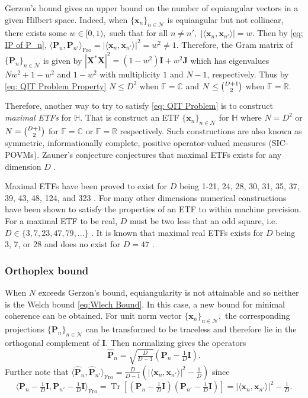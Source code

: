 \documentclass[3p,11pt]{elsarticle}
\newcommand{\bbC}{\mathbb{C}}
\newcommand{\bbF}{\mathbb{F}}
\newcommand{\bbH}{\mathbb{H}}
\newcommand{\bbR}{\mathbb{R}}
\newcommand{\bfI}{\mathbf{I}}
\newcommand{\bfJ}{\mathbf{J}}
\newcommand{\bfP}{\mathbf{P}}
\newcommand{\bfx}{\mathbf{x}}
\newcommand{\bfX}{\mathbf{X}}
\newcommand{\calN}{\mathcal{N}}
\newcommand{\Tr}{\operatorname{Tr}}
\newcommand{\Fro}{\mathrm{Fro}}
\newcommand{\abs}[1]{|{#1}|}
\newcommand{\ip}[2]{\langle{#1},{#2}\rangle}
\theoremstyle{definition}
\begin{document}
Gerzon's bound gives an upper bound on the number of equiangular vectors in a given Hilbert space. Indeed, when $\{\bfx_n\}_{n\in\calN}$ is equiangular but not collinear, there exists some $w\in[0,1),$ such that for all $n\not=n',$ $\abs{\ip{\bfx_n}{\bfx_{n'}}}=w.$ Then by \eqref{eq: IP of P_n}, $\ip{\bfP_n}{\bfP_{n'}}_\Fro=\abs{\ip{\bfx_n}{\bfx_{n'}}}^2=w^2\not=1.$ Therefore, the Gram matrix of $\{\bfP_n\}_{n\in\calN}$ is given by $\abs{\bfX^*\bfX}^2=(1-w^2)\bfI+w^2\bfJ$ which has eigenvalues $Nw^2+1-w^2$ and $1-w^2$ with multiplicity $1$ and $N-1$, respectively. Thus by \eqref{eq: QIT Problem Property} $N\leq D^2$ when $\bbF=\bbC$ and $N\leq\smash{\binom{D+1}{2}}$ when $\bbF=\bbR.$ 

Therefore, another way to try to satisfy \eqref{eq: QIT Problem} is to construct \textit{maximal ETFs} for $\bbH.$ That is construct an ETF $\{\bfx_n\}_{n\in\calN}$ for $\bbH$ where $N=D^2$ or $N=\tbinom{D+1}{2}$ for $\bbF=\bbC$ or $\bbF=\bbR$ respectively. Such constructions are also known as symmetric, informationally complete, positive operator-valued measures (SIC-POVMs). Zauner's conjecture conjectures that maximal ETFs exists for any dimension $D$ \cite{Zauner99}. 

Maximal ETFs have been proved to exist for $D$ being 1-21, 24, 28, 30, 31, 35, 37, 39, 43, 48, 124, and 323 \cite{Knopp}. For many other dimensions numerical constructions have been shown to satisfy the properties of an ETF to within machine precision. For a maximal ETF to be real, $D$ must be two less that an odd square, i.e. $D\in\{3,7,23,47,79,...\}$ \cite{FickusM16}. It is known that maximal real ETFs exists for $D$ being  3, 7, or 28 and does no exist for $D=47$ \cite{BannaiMV05, FickusM16}.

\subsubsection{Orthoplex bound}
When $N$ exceeds Gerzon's bound, equiangularity is not attainable and so neither is the Welch bound \eqref{eq:Wlech Bound}. In this case, a new bound for minimal coherence can be obtained. For unit norm vector $\{\bfx_n\}_{n\in\calN},$ the corresponding projections $\{\bfP_n\}_{n\in\calN}$ can be transformed to be traceless and therefore lie in the orthogonal complement of $\bfI.$ Then normalizing gives the operators
\begin{equation}
    \label{eq:Lifted operators}
    \hat{\bfP}_n=\sqrt{\tfrac{D}{D-1}}(\bfP_n-\tfrac{1}{D}\bfI).
\end{equation} 
Further note that $\ip{\hat{\bfP}_n}{\hat{\bfP}_{n'}}_\Fro=\tfrac{D}{D-1}\left(\abs{\ip{\bfx_n}{\bfx_{n'}}}^2-\tfrac{1}{D}\right)$ since 
\begin{equation}
\label{eq: Unnormalized lifting inner products}
    \ip{\bfP_n-\tfrac{1}{D}\bfI}{\bfP_{n'}-\tfrac{1}{D}\bfI}_\Fro=\Tr\left[(\bfP_n-\tfrac{1}{D}\bfI)(\bfP_{n'}-\tfrac{1}{D}\bfI)\right]=\abs{\ip{\bfx_n}{\bfx_{n'}}}^2-\tfrac{1}{D}.
\end{equation} 
\end{document}
